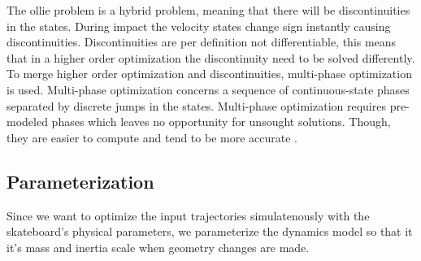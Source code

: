 \documentclass[default,iicol]{sn-jnl}
\theoremstyle{thmstyleone}%
\theoremstyle{thmstyletwo}%
\theoremstyle{thmstylethree}%
\begin{document}
The ollie problem is a hybrid problem, meaning that there will be discontinuities in the states. During impact the velocity states change sign instantly causing discontinuities. Discontinuities are per definition not differentiable, this means that in a higher order optimization the discontinuity need to be solved differently. To merge higher order optimization and discontinuities, multi-phase optimization is used. Multi-phase optimization concerns a sequence of continuous-state phases separated by discrete jumps in the states. Multi-phase optimization requires pre-modeled phases which leaves no opportunity for unsought solutions. Though, they are easier to compute and tend to be more accurate \cite{kelly_introduction_2017}. 

\subsection{Parameterization}\label{s_paropt}
Since we want to optimize the input trajectories simulatenously with the
skateboard's physical parameters, we parameterize the dynamics model so that it
it's mass and inertia scale when geometry changes are made.
\end{document}
